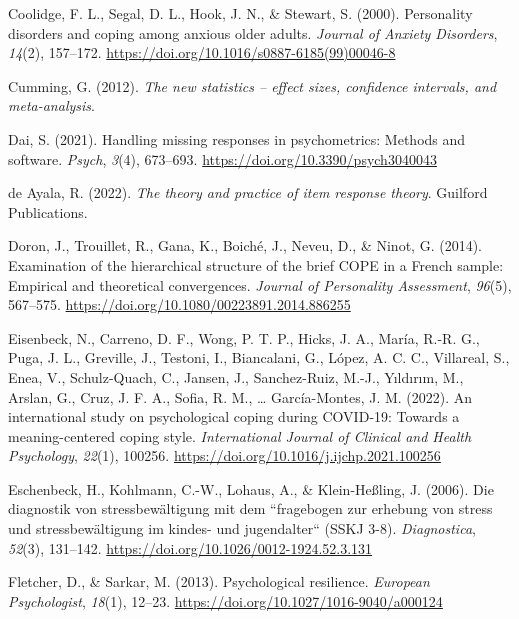 \documentclass[
  man,floatsintext]{apa7}
\newlength{\cslhangindent}
\newenvironment{CSLReferences}[2] %
 {\begin{list}{}{%
  \setlength{\itemindent}{0pt}
  \setlength{\leftmargin}{0pt}
  \setlength{\parsep}{0pt}
  \ifodd #1
   \setlength{\leftmargin}{\cslhangindent}
   \setlength{\itemindent}{-1\cslhangindent}
  \fi
  \setlength{\itemsep}{#2\baselineskip}}}
 {\end{list}}
\begin{document}
\begin{CSLReferences}{1}{0}
Coolidge, F. L., Segal, D. L., Hook, J. N., \& Stewart, S. (2000). Personality disorders and coping among anxious older adults. \emph{Journal of Anxiety Disorders}, \emph{14}(2), 157--172. \url{https://doi.org/10.1016/s0887-6185(99)00046-8}

Cumming, G. (2012). \emph{The new statistics -- effect sizes, confidence intervals, and meta-analysis}.

Dai, S. (2021). Handling missing responses in psychometrics: Methods and software. \emph{Psych}, \emph{3}(4), 673--693. \url{https://doi.org/10.3390/psych3040043}

de Ayala, R. (2022). \emph{The theory and practice of item response theory}. Guilford Publications.

Doron, J., Trouillet, R., Gana, K., Boiché, J., Neveu, D., \& Ninot, G. (2014). Examination of the hierarchical structure of the brief {COPE} in a {French} sample: Empirical and theoretical convergences. \emph{Journal of Personality Assessment}, \emph{96}(5), 567--575. \url{https://doi.org/10.1080/00223891.2014.886255}

Eisenbeck, N., Carreno, D. F., Wong, P. T. P., Hicks, J. A., María, R.-R. G., Puga, J. L., Greville, J., Testoni, I., Biancalani, G., López, A. C. C., Villareal, S., Enea, V., Schulz-Quach, C., Jansen, J., Sanchez-Ruiz, M.-J., Yıldırım, M., Arslan, G., Cruz, J. F. A., Sofia, R. M., \ldots{} García-Montes, J. M. (2022). An international study on psychological coping during {COVID}-19: {Towards} a meaning-centered coping style. \emph{International Journal of Clinical and Health Psychology}, \emph{22}(1), 100256. \url{https://doi.org/10.1016/j.ijchp.2021.100256}

Eschenbeck, H., Kohlmann, C.-W., Lohaus, A., \& Klein-Heßling, J. (2006). Die diagnostik von stressbewältigung mit dem ``fragebogen zur erhebung von stress und stressbewältigung im kindes- und jugendalter`` (SSKJ 3-8). \emph{Diagnostica}, \emph{52}(3), 131--142. \url{https://doi.org/10.1026/0012-1924.52.3.131}

Fletcher, D., \& Sarkar, M. (2013). Psychological resilience. \emph{European Psychologist}, \emph{18}(1), 12--23. \url{https://doi.org/10.1027/1016-9040/a000124}


\end{CSLReferences}
\end{document}
